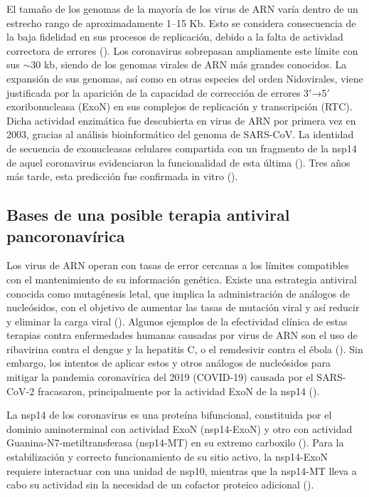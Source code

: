 El tamaño de los genomas de la mayoría de los virus de ARN varía dentro de 
un estrecho rango de aproximadamente 1--15 Kb. Esto se considera consecuencia
de la baja fidelidad en sus procesos de replicación, debido a la falta de 
actividad correctora de errores (\Cite{duffy_why_2018,peck_complexities_2018,sanjuan_viral_2010}). 
Los coronavirus sobrepasan ampliamente este límite con sus $\sim$30 kb, 
siendo de los genomas virales de ARN más grandes conocidos. La expansión de 
sus genomas, así como en otras especies del orden Nidovirales, viene 
justificada por la aparición de la capacidad de corrección de errores 
3$'$→5$'$ exoribonucleasa (ExoN) en sus complejos de replicación y 
transcripción (RTC). Dicha actividad enzimática fue descubierta en virus de 
ARN por primera vez en 2003, gracias al análisis bioinformático del genoma 
de SARS-CoV. La identidad de secuencia de exonucleasas celulares compartida 
con un fragmento de la nsp14 de aquel coronavirus evidenciaron la 
funcionalidad de esta última (\cite{snijder_unique_2003}). Tres años más 
tarde, esta predicción fue confirmada in vitro (\cite{minskaia_discovery_2006}).

\subsection{Bases de una posible terapia antiviral pancoronavírica}

Los virus de ARN operan con tasas de error cercanas a los límites 
compatibles con el mantenimiento de su información genética. Existe una 
estrategia antiviral conocida como mutagénesis letal, que implica la 
administración de análogos de nucleósidos, con el objetivo de aumentar las 
tasas de mutación viral y así reducir y eliminar la carga viral 
(\cite{diaz-martinez_lethal_2018,swanstrom_lethal_2022}). 
Algunos ejemplos de la efectividad clínica de estas terapias contra 
enfermedades humanas causadas por virus de ARN son el uso de ribavirina 
contra el dengue y la hepatitis C, o el remdesivir contra el ébola 
(\cite{huggins_prospective_1991,mulangu_randomized_2019,ortega-prieto_extinction_2013}). 
Sin embargo, los intentos de aplicar estos y otros análogos de nucleósidos 
para mitigar la pandemia coronavírica del 2019 (COVID-19) causada por el 
SARS-CoV-2 fracasaron, principalmente por la actividad ExoN de la nsp14 
(\cite{stevaert_nucleoside_2022}).

La nsp14 de los coronavirus es una proteína bifuncional, constituida por el 
dominio aminoterminal con actividad ExoN (nsp14-ExoN) y otro con actividad 
Guanina-N7-metiltransferasa (nsp14-MT) en su extremo carboxilo
(\cite{chen_functional_2009}). Para la estabilización y correcto 
funcionamiento de su sitio activo, la nsp14-ExoN requiere interactuar con 
una unidad de nsp10, mientras que la nsp14-MT lleva a cabo su actividad sin 
la necesidad de un cofactor proteico adicional (\cite{ferron_structural_2018}).

